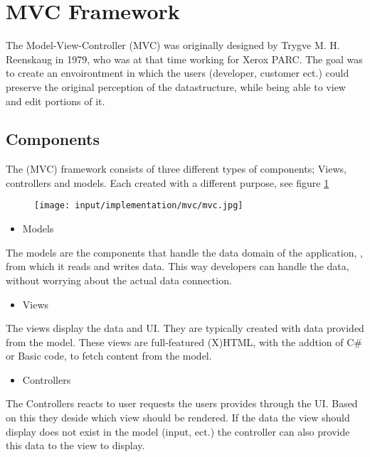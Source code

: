 \section{MVC Framework}
\label{sec:mvc}
The Model-View-Controller (MVC) was originally designed by Trygve M. H. Reenskaug in 1979, who was at that time working for Xerox PARC. The goal was to create an envoirontment in which the users (developer, customer ect.) could preserve the original perception of the datastructure, while being able to view and edit portions of it.

\subsection{Components}

The (MVC) framework consists of three different types of components; Views, controllers and models. Each created with a different purpose, see figure \ref{fig:mvc-drawing}

\begin{figure}[H]
	\centering
		\texttt{[image: input/implementation/mvc/mvc.jpg]}
	\label{fig:mvc-drawing}
\end{figure}


\begin{itemize}
\item Models
\end{itemize}
The models are the components that handle the data domain of the application, , from which it reads and writes data. This way developers can handle the data, without worrying about the actual data connection.

\begin{itemize}
\item Views
\end{itemize}
The views display the data and UI. They are typically created with data provided from the model. These views are full-featured (X)HTML, with the addtion of C\# or Basic code, to fetch content from the model.

\begin{itemize}
\item Controllers
\end{itemize}
The Controllers reacts to user requests the users provides through the UI. Based on this they deside which view should be rendered. If the data the view should display does not exist in the model (input, ect.) the controller can also provide this data to the view to display.

